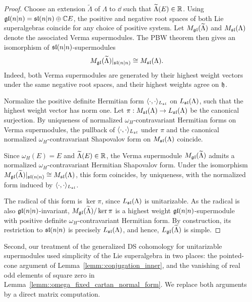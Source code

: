 \begin{proof}
Choose an extension $\widetilde\Lambda$ of $\Lambda$ to $\dd$ such that $\widetilde\Lambda(E)\in\RR$. Using $\gl(n\vert n)=\sl(n\vert n)\oplus\CC E$, the positive and negative root spaces of both Lie superalgebras coincide for any choice of positive system. Let $M_{\gl}(\widetilde{\Lambda})$ and $M_{\sl}(\Lambda)$ denote the associated Verma supermodules. The PBW theorem then gives an isomorphism of $\sl(n\vert n)$-supermodules
\[
M_{\gl}(\widetilde\Lambda)\vert_{\sl(n\vert n)}\cong M_{\sl}(\Lambda).
\]
Indeed, both Verma supermodules are generated by their highest weight vectors under the same negative root spaces, and their highest weights agree on $\hh$.

Normalize the positive definite Hermitian form $\langle \cdot,\cdot\rangle_{L_{\sl}}$ on $L_{\sl}(\Lambda)$, such that the highest weight vector has norm one. Let $\pi:M_{\sl}(\Lambda)\to L_{\sl}(\Lambda)$ be the canonical surjection. By uniqueness of normalized $\omega_{H}$-contravariant Hermitian forms on Verma supermodules, the pullback of $\langle \cdot,\cdot\rangle_{L_{\sl}}$ under $\pi$ and the canonical normalized $\omega_{H}$-contravariant Shapovalov form on $M_{\sl}(\Lambda)$ coincide. 


Since $\omega_H(E)=E$ and $\widetilde\Lambda(E)\in\RR$, the Verma supermodule $M_{\gl}(\widetilde\Lambda)$ admits a normalized $\omega_H$-contravariant Hermitian Shapovalov form. Under the isomorphism $M_{\gl}(\widetilde\Lambda)|_{\sl(n\vert n)}\cong M_{\sl}(\Lambda)$, this form coincides, by uniqueness, with the normalized form induced by $\langle\cdot,\cdot\rangle_{L_{\sl}}$.

The radical of this form is $\ker \pi$, since $L_{\sl}(\Lambda)$ is unitarizable. As the radical is also $\gl(n\vert n)$-invariant, $M_{\gl}(\widetilde{\Lambda})/\ker \pi$ is a highest weight $\gl(n\vert n)$-supermodule with positive definite $\omega_{H}$-contravariant Hermitian form. By construction, its restriction to $\sl(n\vert n)$ is precisely $L_{\sl}(\Lambda)$, and hence, $L_{\gl}(\widetilde{\Lambda})$ is simple.  
\end{proof}

Second, our treatment of the 
generalized DS cohomology for unitarizable supermodules used simplicity of the Lie superalgebra in two places: the
pointed-cone argument of Lemma~\ref{lemm::conjugation_inner}, and the
vanishing of real odd elements of square zero in
Lemma~\ref{lemm::omega_fixed_cartan_normal_form}. We replace both arguments by a direct matrix computation.

